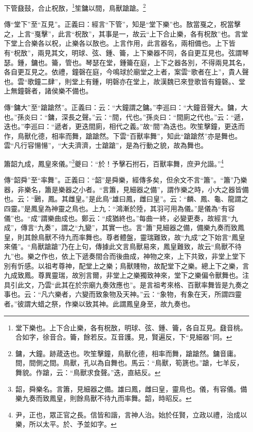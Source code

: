 下管鼗鼓，合止柷敔，\footnote{堂下樂也。上下合止樂，各有柷敔，明球、弦、鍾、籥，各自互見。鼗音桃。合如字，徐音合。籥，餘若反。互音護。見，賢遍反，下“見細器”同。}笙鏞以間，鳥獸蹌蹌。\footnote{鏞，大鐘。跡葴迭也。吹笙擊鐘，鳥獸化德，相率而舞，蹌蹌然。鏞音庸。間，間側之間。鳥獸，孔以為自舞也。馬云：“鳥獸，筍篪也。”蹌，七羊反，舞貌。作蹌，云：“鳥獸求食聲。”迭，直結反。}


{\noindent\zhuan{}\fzbyks 傳“堂下”至“互見”。正義曰：經言“下管”，知是“堂下樂”也。敔當戛之，柷當擊之，上言“戛擊”，此言“柷敔”，其事是一，故云“上下合止樂，各有柷敔”也。言堂下堂上合樂各以柷，止樂各以敔也。上言作用，此言器名，兩相備也。上下皆有“柷敔”，兩見其文，明球、弦、鍾、籥，上下樂器不同，各自更互見也。弦謂琴瑟。鍾，鏞也。籥，管也。琴瑟在堂，鍾籥在庭，上下之器各別，不得兩見其名，各自更互見之。依禮，鐘磬在庭，今鳴球於廟堂之上者，案雲“歌者在上”，貴人聲也。雲“歌鐘二肆”，則堂上有鍾，明磬亦在堂上，故漢魏已來登歌皆有鐘磬。、堂上無鐘磬者，諸侯樂不備也。 \par}

{\noindent\zhuan{}\fzbyks 傳“鏞大”至“蹌蹌然”。正義曰：云：“大鐘謂之鏞。”李巡曰：“大鐘音聲大。鏞，大也。”孫炎曰：“鏞，深長之聲。”云：“間，代也。”孫炎曰：“間廁之代也。”云：“遞，迭也。”李巡曰：“遞者，更迭間廁，相代之義。”故“間”為迭也。吹笙擊鐘，更迭而作，鳥獸化德，相率而舞，蹌蹌然。下雲“百獸率舞”，知此“蹌蹌然”亦是舞也。雲“凡行容愓愓”，“大夫濟濟，士蹌蹌”，是為行動之貌，故為舞也。 \par}

簫韶九成，鳳皇來儀。”\footnote{韶，舜樂名。言簫，見細器之備。雄曰鳳，雌曰皇，靈鳥也。儀，有容儀。備樂九奏而致鳳皇，則餘鳥獸不待九而率舞。韶，時昭反。}夔曰：“於！予擊石拊石，百獸率舞，庶尹允諧。”\footnote{尹，正也，眾正官之長。信皆和諧，言神人治。始於任賢，立政以禮，治成以樂，所以太平。於、予並如字。}

{\noindent\zhuan{}\fzbyks 傳“韶舜”至“率舞”。正義曰：“韶”是舜樂，經傳多矣，但余文不言“簫”。“簫”乃樂器，非樂名，簫是樂器之小者。“言簫，見細器之備”，謂作樂之時，小大之器皆備也。云：“鶠，鳳。其雌皇。”是此鳥“雄曰鳳，雌曰皇”。云：“麟、鳳、龜、龍謂之四靈。”是鳳皇為神靈之鳥也。上九：“鴻漸於陸，其羽可用為儀。”是儀為“有容儀”也。“成”謂樂曲成也。鄭云：“成猶終也。”每曲一終，必變更奏，故經言“九成”，傳言“九奏”，謂之“九變”，其實一也。言“簫”見細器之備，備樂九奏而致鳳皇，則其餘鳥獸不待九而率舞也。尊者體盤，靈瑞難致，故“九成”之下始言“鳳皇來儀”。“鳥獸蹌蹌”乃在上句，傳據此文言鳥獸易來，鳳皇難致，故云“鳥獸不待九”也。樂之作也，依上下遞奏間合而後曲成，神物之來，上下共致，非堂上堂下別有忻感。以祖考尊神，配堂上之樂；鳥獸賤物，故配堂下之樂。總上下之樂，言九成致鳳。尊異靈瑞，故別言爾，非堂上之樂獨致神來，堂下之樂偏令獸舞也。注具引此文，乃雲“此其在於宗廟九奏效應也”。是言祖考來格、百獸率舞皆是九奏之事也。云：“凡六樂者，六變而致象物及天神。”云：“象物，有象在天，所謂四靈者。”彼謂大蜡之祭，作樂以致其神。此謂鳳皇身至，故九奏也。 \par}

